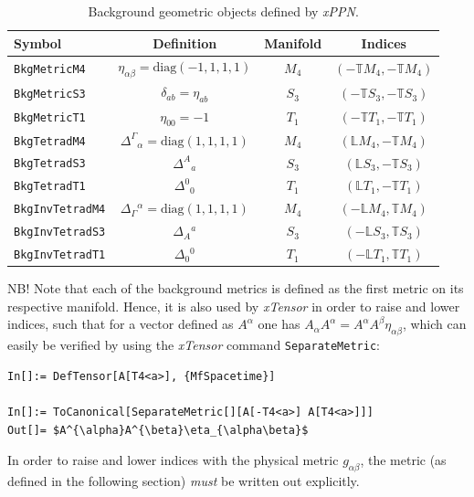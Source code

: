 \documentclass[notitlepage,a4paper,aps,prd,onecolumn,superscriptaddress,nofootinbib,groupedaddress,longbibliography]{revtex4-1}
\newcommand{\xPPN}{\emph{xPPN}}
\newcommand{\xTensor}{\emph{xTensor}}
\begin{document}
\begin{table}[htb]
\centering
\begin{tabular}{l|c|c|c}
Symbol & Definition & Manifold & Indices\\\hline
\lstinline/BkgMetricM4/ & $\eta_{\alpha\beta} = \mathrm{diag}(-1, 1, 1, 1)$ & $M_4$ & $(-\mathbb{T}M_4, -\mathbb{T}M_4)$\\
\lstinline/BkgMetricS3/ & $\delta_{ab} = \eta_{ab}$ & $S_3$ & $(-\mathbb{T}S_3, -\mathbb{T}S_3)$\\
\lstinline/BkgMetricT1/ & $\eta_{00} = -1$ & $T_1$ & $(-\mathbb{T}T_1, -\mathbb{T}T_1)$\\
\lstinline/BkgTetradM4/ & $\Delta^{\Gamma}{}_{\alpha} = \mathrm{diag}(1, 1, 1, 1)$ & $M_4$ & $(\mathbb{L}M_4, -\mathbb{T}M_4)$\\
\lstinline/BkgTetradS3/ & $\Delta^A{}_a$ & $S_3$ & $(\mathbb{L}S_3, -\mathbb{T}S_3)$\\
\lstinline/BkgTetradT1/ & $\Delta^0{}_0$ & $T_1$ & $(\mathbb{L}T_1, -\mathbb{T}T_1)$\\
\lstinline/BkgInvTetradM4/ & $\Delta_{\Gamma}{}^{\alpha} = \mathrm{diag}(1, 1, 1, 1)$ & $M_4$ & $(-\mathbb{L}M_4, \mathbb{T}M_4)$\\
\lstinline/BkgInvTetradS3/ & $\Delta_A{}^a$ & $S_3$ & $(-\mathbb{L}S_3, \mathbb{T}S_3)$\\
\lstinline/BkgInvTetradT1/ & $\Delta_0{}^0$ & $T_1$ & $(-\mathbb{L}T_1, \mathbb{T}T_1)$\\
\end{tabular}
\caption{Background geometric objects defined by \xPPN.}
\label{tab:bkgobj}
\end{table}

NB! Note that each of the background metrics is defined as the first metric on its respective manifold. Hence, it is also used by \xTensor{} in order to raise and lower indices, such that for a vector defined as \(A^{\alpha}\) one has \(A_{\alpha}A^{\alpha} = A^{\alpha}A^{\beta}\eta_{\alpha\beta}\), which can easily be verified by using the \xTensor{} command \lstinline/SeparateMetric/:
\begin{lstlisting}
In[]:= DefTensor[A[T4<a>], {MfSpacetime}]

In[]:= ToCanonical[SeparateMetric[][A[-T4<a>] A[T4<a>]]]
Out[]= $A^{\alpha}A^{\beta}\eta_{\alpha\beta}$
\end{lstlisting}
In order to raise and lower indices with the physical metric \(g_{\alpha\beta}\), the metric (as defined in the following section) \emph{must} be written out explicitly.
\end{document}

